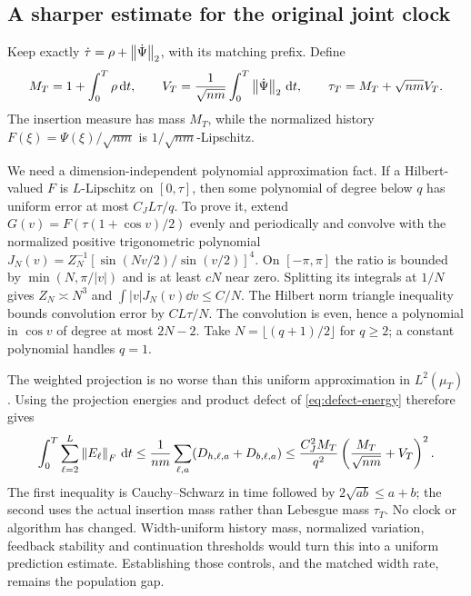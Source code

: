 \subsection{A sharper estimate for the original joint clock}
\label{app:comparison-joint}

Keep exactly $\dot\tau=\rho+\left\lVert \dot\Psi\right\rVert_2$, with its matching prefix.
Define
\[
M_T=1+\int_0^T\rho\,\mathrm{d} t,\qquad
V_T=\frac{1}{\sqrt{nm}}\int_0^T\left\lVert \dot\Psi\right\rVert_2\,\mathrm{d} t,\qquad
\tau_T=M_T+\sqrt{nm}V_T.
\]
The insertion measure has mass $M_T$, while the normalized history
$F(\xi)=\Psi(\xi)/\sqrt{nm}$ is $1/\sqrt{nm}$-Lipschitz.

We need a dimension-independent polynomial approximation fact.  If a
Hilbert-valued $F$ is $L$-Lipschitz on $[0,\tau]$, then some polynomial
of degree below $q$ has uniform error at most $C_JL\tau/q$.
To prove it, extend $G(v)=F(\tau(1+\cos v)/2)$ evenly and periodically and
convolve with the normalized positive trigonometric polynomial
$J_N(v)=Z_N^{-1}[\sin(Nv/2)/\sin(v/2)]^4$.
On $[-\pi,\pi]$ the ratio is bounded by $\min(N,\pi/|v|)$ and is at least
$cN$ near zero.  Splitting its integrals at $1/N$ gives $Z_N\asymp N^3$
and $\int|v|J_N(v)\dd v\le C/N$.
The Hilbert norm triangle inequality bounds convolution error by
$C L\tau/N$.  The convolution is even, hence a polynomial in $\cos v$
of degree at most $2N-2$.  Take $N=\lfloor(q+1)/2\rfloor$ for $q\ge2$;
a constant polynomial handles $q=1$.

The weighted projection is no worse than this uniform approximation in
$L^2(\mu_T)$.  Using the projection energies and product defect of
\eqref{eq:defect-energy} therefore gives
\begin{equation}
 \int_0^T\sum_{\ell=2}^L\left\lVert E_\ell\right\rVert_F\,\mathrm{d} t
 \le \frac{1}{nm}\sum_{\ell,a}(D_{h,\ell,a}+D_{b,\ell,a})
 \le \frac{C_J^2M_T}{q^2}
       \left(\frac{M_T}{\sqrt{nm}}+V_T\right)^2.
 \label{cmp:weighted-jackson}
\end{equation}
The first inequality is Cauchy--Schwarz in time followed by
$2\sqrt{ab}\le a+b$; the second uses the actual insertion mass rather than
Lebesgue mass $\tau_T$.  No clock or algorithm has changed.  Width-uniform
history mass, normalized variation, feedback stability and continuation
thresholds would turn this into a uniform prediction estimate.  Establishing
those controls, and the matched width rate, remains the population gap.
